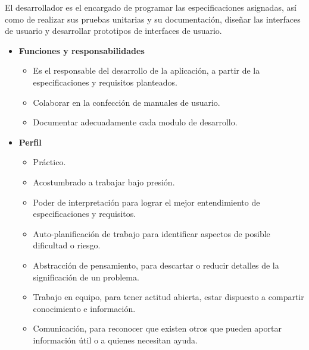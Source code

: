         El desarrollador es el encargado de programar las especificaciones asignadas, así como de realizar sus pruebas unitarias y su documentación, diseñar las interfaces de usuario y desarrollar prototipos de interfaces de usuario.
		\begin{itemize}
			\item \textbf{Funciones y responsabilidades}
            	\begin{itemize}
                    \item Es el responsable del desarrollo de la aplicación, a partir de la especificaciones y requisitos planteados.
                    \item Colaborar en la confección de manuales de usuario.
                    \item Documentar adecuadamente cada modulo de desarrollo.
				\end{itemize}
            
            \item \textbf{Perfil}
                \begin{itemize}
                    \item Práctico.
                    \item Acostumbrado a trabajar bajo presión.
                    \item Poder de interpretación para lograr el mejor entendimiento de especificaciones y requisitos.
                    \item Auto-planificación de trabajo para identificar aspectos de posible dificultad o riesgo.
                    \item Abstracción de pensamiento, para descartar o reducir detalles de la significación de un problema.
                    \item Trabajo en equipo, para tener actitud abierta, estar dispuesto a compartir conocimiento e información.
                    \item Comunicación, para reconocer que existen otros que pueden aportar información útil o a quienes necesitan ayuda.


\end{itemize}
\end{itemize}
